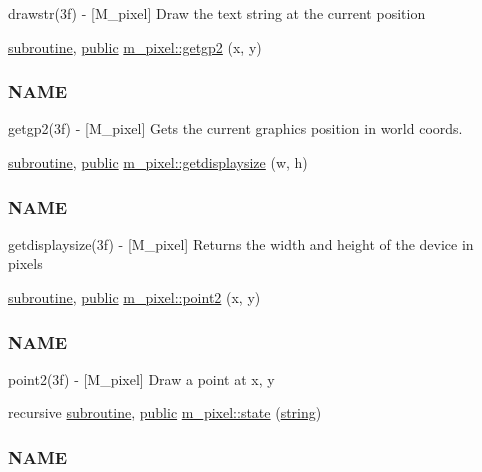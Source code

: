 \begin{DoxyCompactItemize}
\begin{DoxyCompactList}
drawstr(3f) -\/ \mbox{[}M\+\_\+pixel\mbox{]} Draw the text string at the current position \end{DoxyCompactList}\item 
\hyperlink{M__stopwatch_83_8txt_acfbcff50169d691ff02d4a123ed70482}{subroutine}, \hyperlink{M__stopwatch_83_8txt_a2f74811300c361e53b430611a7d1769f}{public} \hyperlink{namespacem__pixel_a626d769d3dae0c292e3ef1617ad43efb}{m\+\_\+pixel\+::getgp2} (x, y)
\begin{DoxyCompactList}\small\item\em \subsubsection*{N\+A\+ME}

getgp2(3f) -\/ \mbox{[}M\+\_\+pixel\mbox{]} Gets the current graphics position in world coords. \end{DoxyCompactList}\item 
\hyperlink{M__stopwatch_83_8txt_acfbcff50169d691ff02d4a123ed70482}{subroutine}, \hyperlink{M__stopwatch_83_8txt_a2f74811300c361e53b430611a7d1769f}{public} \hyperlink{namespacem__pixel_acacbc4462423b9aa0f591cbe7aba4ec6}{m\+\_\+pixel\+::getdisplaysize} (w, h)
\begin{DoxyCompactList}\small\item\em \subsubsection*{N\+A\+ME}

getdisplaysize(3f) -\/ \mbox{[}M\+\_\+pixel\mbox{]} Returns the width and height of the device in pixels \end{DoxyCompactList}\item 
\hyperlink{M__stopwatch_83_8txt_acfbcff50169d691ff02d4a123ed70482}{subroutine}, \hyperlink{M__stopwatch_83_8txt_a2f74811300c361e53b430611a7d1769f}{public} \hyperlink{namespacem__pixel_a11234e0b33104eb0afb24f928b072053}{m\+\_\+pixel\+::point2} (x, y)
\begin{DoxyCompactList}\small\item\em \subsubsection*{N\+A\+ME}

point2(3f) -\/ \mbox{[}M\+\_\+pixel\mbox{]} Draw a point at x, y \end{DoxyCompactList}\item 
recursive \hyperlink{M__stopwatch_83_8txt_acfbcff50169d691ff02d4a123ed70482}{subroutine}, \hyperlink{M__stopwatch_83_8txt_a2f74811300c361e53b430611a7d1769f}{public} \hyperlink{namespacem__pixel_aa24c465b23b0ddda341e97bc206fe249}{m\+\_\+pixel\+::state} (\hyperlink{what__overview_81_8txt_a74cb7e955273b9f9157b4f0c18a38849}{string})
\begin{DoxyCompactList}\small\item\em \subsubsection*{N\+A\+ME}


\end{DoxyCompactList}
\end{DoxyCompactItemize}
